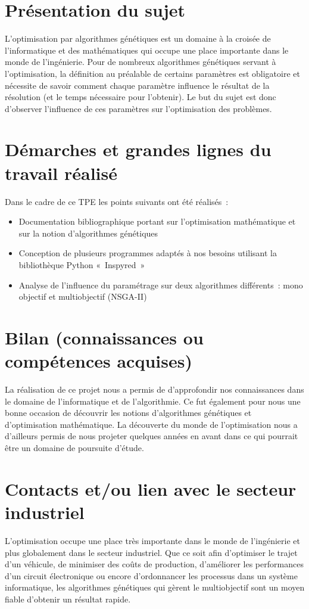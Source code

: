 \documentclass[12pt]{report}
\begin{document}
  \section{Présentation du sujet}
   L’optimisation par algorithmes génétiques est un domaine à la croisée de l’informatique et des mathématiques qui occupe une place importante dans le monde de l’ingénierie. Pour de nombreux algorithmes génétiques servant à l’optimisation, la définition au préalable de certains paramètres est obligatoire et nécessite de savoir comment chaque paramètre influence le résultat de la résolution (et le temps nécessaire pour l’obtenir). Le but du sujet est donc d’observer l’influence de ces paramètres sur l’optimisation des problèmes.
  \section{Démarches et grandes lignes du travail réalisé}
  Dans le cadre de ce TPE les points suivants ont été réalisés :
  \begin{itemize}
    \item Documentation bibliographique portant sur l’optimisation mathématique et sur la notion d’algorithmes génétiques
    \item Conception de plusieurs programmes adaptés à nos besoins utilisant la bibliothèque Python « Inspyred \cite{inspyred}»
    \item Analyse de l’influence du paramétrage sur deux algorithmes différents : mono objectif et multiobjectif (NSGA-II)
  \end{itemize}
  \section{Bilan (connaissances ou compétences acquises)}
  La réalisation de ce projet nous a permis de d’approfondir nos connaissances dans le domaine de l’informatique et de l’algorithmie. Ce fut également pour nous une bonne occasion de découvrir les notions d’algorithmes génétiques et d’optimisation mathématique. La découverte du monde de l'optimisation nous a d'ailleurs permis de nous projeter quelques années en avant dans ce qui pourrait être un domaine de poursuite d'étude.
  \section{Contacts et/ou lien avec le secteur industriel}
  L’optimisation occupe une place très importante dans le monde de l’ingénierie et plus globalement dans le secteur industriel. Que ce soit afin d'optimiser le trajet d'un véhicule, de minimiser des coûts de production, d'améliorer les performances d'un circuit électronique ou encore d'ordonnancer les processus dans un système informatique, les algorithmes génétiques qui gèrent le multiobjectif sont un moyen fiable d’obtenir un résultat rapide.
\end{document}
